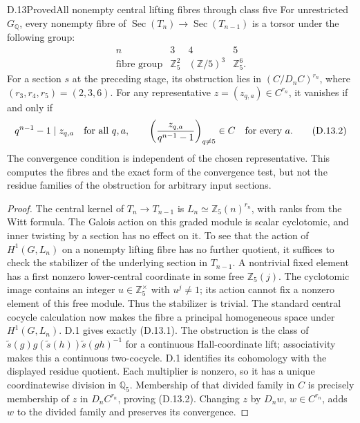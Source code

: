 \begin{statement}{D.13}{Proved}{All nonempty central lifting fibres through class five}
For unrestricted \(G_{\mathbb Q}\), every nonempty fibre of
\(\operatorname{Sec}(T_n)\to\operatorname{Sec}(T_{n-1})\)
is a torsor under the following group:
\[
\begin{array}{c|ccc}
n&3&4&5\\\hline
\text{fibre group}&\mathbb Z_5^2&(\mathbb Z/5)^3&\mathbb Z_5^6.
\end{array}                                                    \tag{D.13.1}
\]
For a section \(s\) at the preceding stage, its obstruction
lies in \((C/D_nC)^{r_n}\), where
\((r_3,r_4,r_5)=(2,3,6)\). For any representative
\(z=(z_{q,a})\in C^{r_n}\), it vanishes if and only if
\[
 q^{n-1}-1\mid z_{q,a}\quad\hbox{for all }q,a,
 \qquad
 \left(\frac{z_{q,a}}{q^{n-1}-1}\right)_{q\ne5}\in C
                        \quad\hbox{for every }a.               \tag{D.13.2}
\]
The convergence condition is independent of the chosen
representative. This computes the fibres and the exact
form of the convergence test, but not the residue families
of the obstruction for arbitrary input sections.
\end{statement}
\begin{proof}
The central kernel of \(T_n\to T_{n-1}\) is
\(L_n\simeq\mathbb Z_5(n)^{r_n}\), with ranks from the
Witt formula. The Galois action on this graded module is
scalar cyclotomic, and inner twisting by a section has
no effect on it. To see that the action of \(H^1(G,L_n)\)
on a nonempty lifting fibre has no further quotient, it
suffices to check the stabilizer of the underlying
section in \(T_{n-1}\). A nontrivial fixed element has a
first nonzero lower-central coordinate in some free
\(\mathbb Z_5(j)\). The cyclotomic image contains an
integer \(u\in\mathbb Z_5^\times\) with \(u^j\ne1\);
its action cannot fix a nonzero element of this free
module. Thus the stabilizer is trivial. The standard
central cocycle calculation now makes the fibre a
principal homogeneous space under \(H^1(G,L_n)\).
D.1 gives exactly (D.13.1). The obstruction is the class
of \(\widetilde s(g)g(\widetilde s(h))\widetilde s(gh)^{-1}\)
for a continuous Hall-coordinate lift; associativity
makes this a continuous two-cocycle. D.1 identifies its
cohomology with the displayed residue quotient. Each
multiplier is nonzero, so it has a unique coordinatewise
division in \(\mathbb Q_5\). Membership of that divided
family in \(C\) is precisely membership of \(z\) in
\(D_nC^{r_n}\), proving (D.13.2). Changing \(z\) by
\(D_nw\), \(w\in C^{r_n}\), adds \(w\) to the divided
family and preserves its convergence.
\end{proof}

